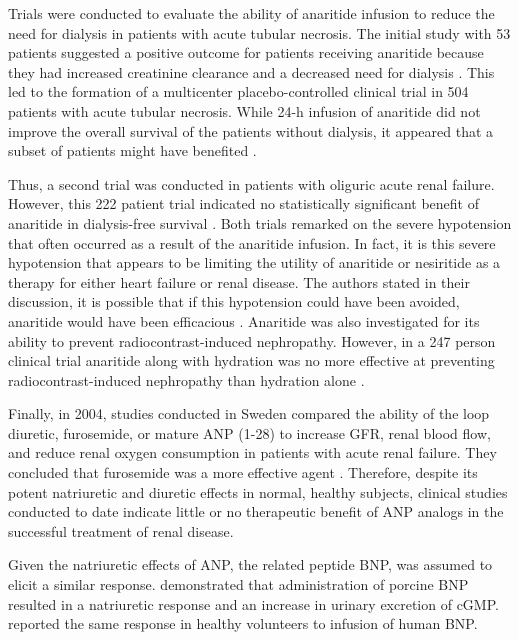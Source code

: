 \documentclass[14pt,a4paper,onecolumn]{extarticle}
\begin{document}
Trials were conducted to evaluate the ability of anaritide infusion to reduce the need for dialysis in patients with acute tubular necrosis. The initial study with 53 patients suggested a positive outcome for patients receiving anaritide because they had increased creatinine clearance and a decreased need for dialysis \citep{Rahman1994}. This led to the formation of a multicenter placebo-controlled clinical trial in 504 patients with acute tubular necrosis. While 24-h infusion of anaritide did not improve the overall survival of the patients without dialysis, it appeared that a subset of patients might have benefited \citep{Allgren1997}.

Thus, a second trial was conducted in patients with oliguric acute renal failure. However, this 222 patient trial indicated no statistically significant benefit of anaritide in dialysis-free survival \citep{Lewis2000}. Both trials remarked on the severe hypotension that often occurred as a result of the anaritide infusion. In fact, it is this severe hypotension that appears to be limiting the utility of anaritide or nesiritide as a therapy for either heart failure or renal disease. The authors stated in their discussion, it is possible that if this hypotension could have been avoided, anaritide would have been efficacious \citep{Lewis2000}.  Anaritide was also investigated for its ability to prevent radiocontrast-induced nephropathy. However, in a 247 person clinical trial anaritide along with hydration was no more effective at preventing radiocontrast-induced nephropathy than hydration alone \citep{Kurnik1998}.

Finally, in 2004, studies conducted in Sweden compared the ability of the loop diuretic, furosemide, or mature ANP (1-28) to increase GFR, renal blood flow, and reduce renal oxygen consumption in patients with acute renal failure. They concluded that furosemide was a more effective agent \citep{Sward2005}. Therefore, despite its potent natriuretic and diuretic effects in normal, healthy subjects, clinical studies conducted to date indicate little or no therapeutic benefit of ANP analogs in the successful treatment of renal disease.

Given the natriuretic effects of ANP, the related peptide BNP, was assumed to elicit a similar response.  \citep{McGregor1990} demonstrated that administration of porcine BNP resulted in a natriuretic response and an increase in urinary excretion of cGMP. \citep{Yoshimura1991} reported the same response in healthy volunteers to infusion of human BNP.
\end{document}

